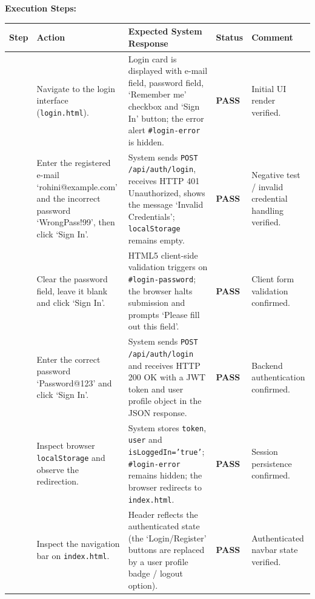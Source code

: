 \documentclass{tietreport}
\begin{document}
\vspace{-0.4em}
\noindent\textbf{Execution Steps:}
\begin{center}
\footnotesize
\renewcommand{\arraystretch}{1.02}
\setlength{\tabcolsep}{3pt}\begin{tabularx}{\textwidth}{|>{\centering\arraybackslash}p{0.9cm}|>{\raggedright\arraybackslash}p{3.3cm}|>{\raggedright\arraybackslash}X|>{\centering\arraybackslash}p{1.1cm}|>{\centering\arraybackslash\scriptsize}p{2.3cm}|}
\hline
\textbf{Step} & \textbf{Action} & \textbf{Expected System Response} & \textbf{Status} & \textbf{Comment} \\
\hline
1 & Navigate to the login interface (\texttt{login.html}). & Login card is displayed with e-mail field, password field, `Remember me' checkbox and `Sign In' button; the error alert \texttt{\#login-error} is hidden. & \textbf{PASS} & {\scriptsize Initial UI render verified.} \\
\hline
2 & Enter the registered e-mail `rohini@example.com' and the incorrect password `WrongPass!99', then click `Sign In'. & System sends \texttt{POST /api/auth/login}, receives HTTP 401 Unauthorized, shows the message `Invalid Credentials'; \texttt{localStorage} remains empty. & \textbf{PASS} & {\scriptsize Negative test / invalid credential handling verified.} \\
\hline
3 & Clear the password field, leave it blank and click `Sign In'. & HTML5 client-side validation triggers on \texttt{\#login-password}; the browser halts submission and prompts `Please fill out this field'. & \textbf{PASS} & {\scriptsize Client form validation confirmed.} \\
\hline
4 & Enter the correct password `Password@123' and click `Sign In'. & System sends \texttt{POST /api/auth/login} and receives HTTP 200 OK with a JWT token and user profile object in the JSON response. & \textbf{PASS} & {\scriptsize Backend authentication confirmed.} \\
\hline
5 & Inspect browser \texttt{localStorage} and observe the redirection. & System stores \texttt{token}, \texttt{user} and \texttt{isLoggedIn='true'}; \texttt{\#login-error} remains hidden; the browser redirects to \texttt{index.html}. & \textbf{PASS} & {\scriptsize Session persistence confirmed.} \\
\hline
6 & Inspect the navigation bar on \texttt{index.html}. & Header reflects the authenticated state (the `Login/Register' buttons are replaced by a user profile badge / logout option). & \textbf{PASS} & {\scriptsize Authenticated navbar state verified.} \\
\hline
\end{tabularx}
\end{center}
\end{document}
